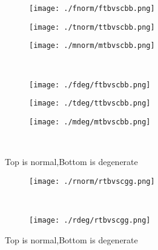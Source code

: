 \documentclass[aps,floats,floatfix,nofootinbib]{revtex4-1}
\begin{document}
\begin{center}
\begin{figure}
\begin{subfigure}{0.3\textwidth}
\texttt{[image: ./fnorm/ftbvscbb.png]}
\label{}
\end{subfigure}
\begin{subfigure}{0.3\textwidth}
\texttt{[image: ./tnorm/ttbvscbb.png]}
\label{}
\end{subfigure}
\begin{subfigure}{0.3\textwidth}
\texttt{[image: ./mnorm/mtbvscbb.png]}
\label{}
\end{subfigure}\\
\begin{subfigure}{0.3\textwidth}
\texttt{[image: ./fdeg/ftbvscbb.png]}
\label{}
\end{subfigure}
\begin{subfigure}{0.3\textwidth}
\texttt{[image: ./tdeg/ttbvscbb.png]}
\label{}
\end{subfigure}
\begin{subfigure}{0.3\textwidth}
\texttt{[image: ./mdeg/mtbvscbb.png]}
\label{}
\end{subfigure}\\
\caption{Top is normal,Bottom is degenerate}
\end{figure}
\end{center}

\begin{center}
\begin{figure}
\begin{subfigure}{0.95\textwidth}
\texttt{[image: ./rnorm/rtbvscgg.png]}
\label{}
\end{subfigure}\\
\begin{subfigure}{0.95\textwidth}
\texttt{[image: ./rdeg/rtbvscgg.png]}
\label{}
\end{subfigure}
\caption{Top is normal,Bottom is degenerate}
\end{figure}
\end{center}
\end{document}
